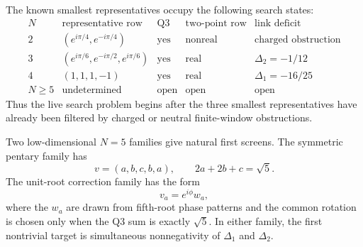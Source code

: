 \begin{principle}
\label{prin:innovation-input-layered-search-table}
The known smallest representatives occupy the following search states:
$$
\begin{array}{c|c|c|c|c}
N & \text{representative row} & \text{Q3} & \text{two-point row} &
\text{link deficit}\\
\hline
2 & (e^{i\pi/4},e^{-i\pi/4}) &
\text{yes} & \text{nonreal} & \text{charged obstruction}\\
3 & (e^{i\pi/6},e^{-i\pi/2},e^{i\pi/6}) &
\text{yes} & \text{real} & \Delta_2=-1/12\\
4 & (1,1,1,-1) &
\text{yes} & \text{real} & \Delta_1=-16/25\\
N\ge5 & \text{undetermined} &
\text{open} & \text{open} & \text{open}
\end{array}
$$
Thus the live search problem begins after the three smallest
representatives have already been filtered by charged or neutral
finite-window obstructions.
\end{principle}

\begin{principle}
\label{prin:innovation-input-candidate-families-next-screen}
Two low-dimensional $N=5$ families give natural first screens. The
symmetric pentary family has
$$
v=(a,b,c,b,a),
\qquad
2a+2b+c=\sqrt5.
$$
The unit-root correction family has the form
$$
v_a=e^{i\phi}w_a,
$$
where the $w_a$ are drawn from fifth-root phase patterns and the common
rotation is chosen only when the Q3 sum is exactly $\sqrt5$. In either
family, the first nontrivial target is simultaneous nonnegativity of
$\Delta_1$ and $\Delta_2$.
\end{principle}

